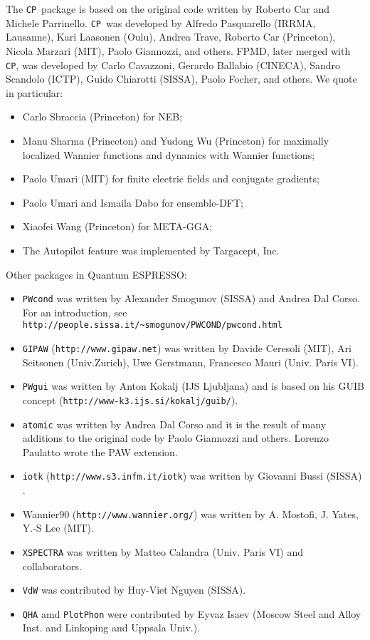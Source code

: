 \documentclass[12pt,a4paper]{article}
\def\qe{{\sc Quantum ESPRESSO}}
\def\CP{\texttt{CP}}
\begin{document}
The \CP\ package is based on the original code written by
 Roberto Car
and Michele Parrinello. \CP\ was developed by Alfredo Pasquarello
(IRRMA, Lausanne), Kari Laasonen (Oulu), Andrea Trave, Roberto
Car (Princeton), Nicola Marzari (MIT), Paolo Giannozzi, and others.
FPMD, later merged with \CP, was developed by Carlo
Cavazzoni, 
Gerardo Ballabio (CINECA), Sandro Scandolo (ICTP), 
Guido Chiarotti (SISSA), Paolo Focher, and others.
We quote in particular:
\begin{itemize}
  \item Carlo Sbraccia (Princeton) for NEB;
  \item Manu Sharma (Princeton) and Yudong Wu (Princeton) for
   maximally localized Wannier functions and dynamics with 
   Wannier functions;
  \item Paolo Umari (MIT) for finite electric fields and conjugate
   gradients;
  \item Paolo Umari and Ismaila Dabo for ensemble-DFT;
  \item Xiaofei Wang (Princeton) for META-GGA;
  \item The Autopilot feature was implemented by Targacept, Inc.
\end{itemize}
Other packages in \qe:
\begin{itemize}
\item
\texttt{PWcond} was written by Alexander Smogunov (SISSA) and Andrea 
Dal Corso. For an introduction, see 
\texttt{http://people.sissa.it/\~{}smogunov/PWCOND/pwcond.html}
\item
\texttt{GIPAW} (\texttt{http://www.gipaw.net})
was written by Davide Ceresoli (MIT), Ari Seitsonen (Univ.Zurich),
Uwe Gerstmann,  Francesco Mauri (Univ. Paris VI).
\item
\texttt{PWgui} was written by Anton Kokalj (IJS Ljubljana) and is 
based on his GUIB concept (\texttt{http://www-k3.ijs.si/kokalj/guib/}).
\item
\texttt{atomic} was written by Andrea Dal Corso and it is the result 
of many additions to the original code by Paolo Giannozzi 
and others. Lorenzo Paulatto wrote the PAW extension.
\item
\texttt{iotk} (\texttt{http://www.s3.infm.it/iotk}) was written by Giovanni Bussi  (SISSA)  .
\item
Wannier90 (\texttt{http://www.wannier.org/}) was written by A. Mostofi, 
J. Yates, Y.-S Lee (MIT).
\item
\texttt{XSPECTRA} was written by Matteo Calandra (Univ. Paris VI)
and collaborators.
\item \texttt{VdW} was contributed by Huy-Viet Nguyen (SISSA).
\item
\texttt{QHA} amd \texttt{PlotPhon} were contributed by Eyvaz Isaev
 (Moscow Steel and Alloy Inst. and Linkoping and Uppsala Univ.).
\end{itemize}
\end{document}
